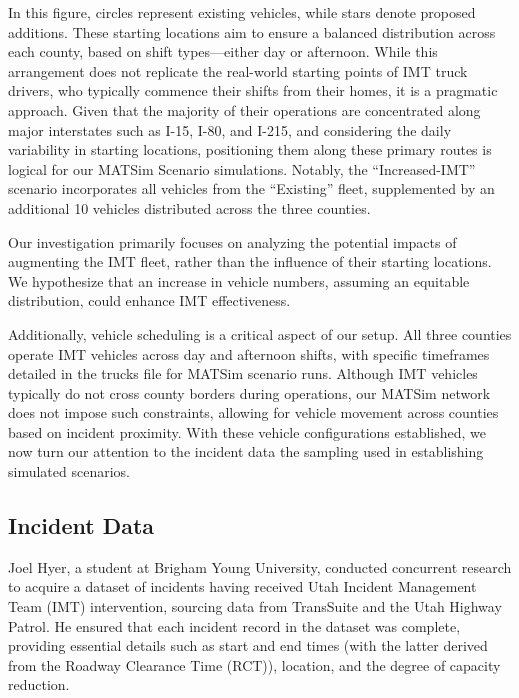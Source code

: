 \documentclass[fancy, oneside, mastersfancy, ms]{byuthesis}
\begin{document}
In this figure, circles represent existing vehicles, while stars denote
proposed additions. These starting locations aim to ensure a balanced
distribution across each county, based on shift types---either day or
afternoon. While this arrangement does not replicate the real-world
starting points of IMT truck drivers, who typically commence their
shifts from their homes, it is a pragmatic approach. Given that the
majority of their operations are concentrated along major interstates
such as I-15, I-80, and I-215, and considering the daily variability in
starting locations, positioning them along these primary routes is
logical for our MATSim Scenario simulations. Notably, the
``Increased-IMT'' scenario incorporates all vehicles from the
``Existing'' fleet, supplemented by an additional 10 vehicles
distributed across the three counties.

Our investigation primarily focuses on analyzing the potential impacts
of augmenting the IMT fleet, rather than the influence of their starting
locations. We hypothesize that an increase in vehicle numbers, assuming
an equitable distribution, could enhance IMT effectiveness.

Additionally, vehicle scheduling is a critical aspect of our setup. All
three counties operate IMT vehicles across day and afternoon shifts,
with specific timeframes detailed in the trucks file for MATSim scenario
runs. Although IMT vehicles typically do not cross county borders during
operations, our MATSim network does not impose such constraints,
allowing for vehicle movement across counties based on incident
proximity. With these vehicle configurations established, we now turn
our attention to the incident data the sampling used in establishing
simulated scenarios.

\hypertarget{incident-data}{%
\subsection{Incident Data}\label{incident-data}}

Joel Hyer, a student at Brigham Young University, conducted concurrent
research to acquire a dataset of incidents having received Utah Incident
Management Team (IMT) intervention, sourcing data from TransSuite and
the Utah Highway Patrol. He ensured that each incident record in the
dataset was complete, providing essential details such as start and end
times (with the latter derived from the Roadway Clearance Time (RCT)),
location, and the degree of capacity reduction.
\end{document}
